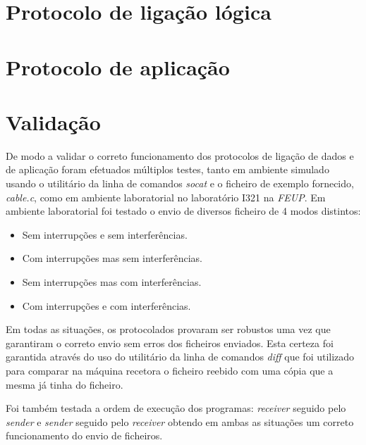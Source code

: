 \documentclass[a4paper,11pt,portuguese]{article}
\begin{document}
\section{Protocolo de ligação lógica}



\section{Protocolo de aplicação}



\section{Validação}

    De modo a validar o correto funcionamento dos protocolos de ligação de dados
    e de aplicação foram efetuados múltiplos testes, tanto em ambiente simulado usando
    o utilitário da linha de comandos \textit{socat} e o ficheiro de exemplo fornecido,
    \textit{cable.c}, como em ambiente laboratorial no laboratório I321 na
    \textit{FEUP}. Em ambiente laboratorial foi testado o envio de diversos ficheiro
    de 4 modos distintos:

    \begin{itemize}
        \item Sem interrupções e sem interferências.
        \item Com interrupções mas sem interferências.
        \item Sem interrupções mas com interferências.
        \item Com interrupções e com interferências.
    \end{itemize}

    Em todas as situações, os protocolados provaram ser robustos uma vez que garantiram o
    correto envio sem erros dos ficheiros enviados. Esta certeza foi garantida através do
    uso do utilitário da linha de comandos \textit{diff} que foi utilizado para comparar
    na máquina recetora o ficheiro reebido com uma cópia que a mesma já tinha do ficheiro. \par

    Foi também testada a ordem de execução dos programas: \textit{receiver} seguido pelo
    \textit{sender} e \textit{sender} seguido pelo \textit{receiver} obtendo
    em ambas as situações um correto funcionamento do envio de ficheiros.

\end{document}
